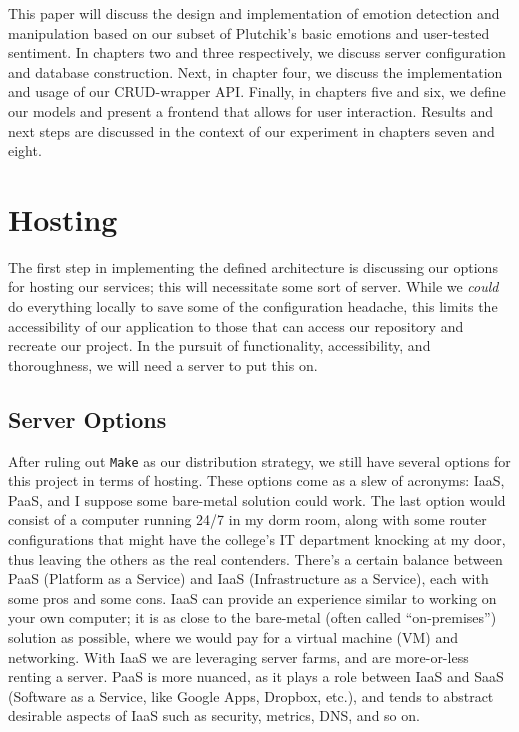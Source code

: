 \documentclass[11pt, twoside, reqno]{book}
\begin{document}
This paper will discuss the design and implementation of emotion detection and manipulation based on our subset of Plutchik's basic emotions and user-tested sentiment. In chapters two and three respectively, we discuss server configuration and database construction. Next, in chapter four, we discuss the implementation and usage of our CRUD-wrapper API. Finally, in chapters five and six, we define our models and present a frontend that allows for user interaction. Results and next steps are discussed in the context of our experiment in chapters seven and eight.

























\chapter{Hosting}

The first step in implementing the defined architecture is discussing our options for hosting our services; this will necessitate some sort of server. While we \textit{could} do everything locally to save some of the configuration headache, this limits the accessibility of our application to those that can access our repository and recreate our project. In the pursuit of functionality, accessibility, and thoroughness, we will need a server to put this on.

\section{Server Options}

After ruling out \texttt{Make} as our distribution strategy, we still have several options for this project in terms of hosting. These options come as a slew of acronyms: IaaS, PaaS, and I suppose some bare-metal solution could work. The last option would consist of a computer running 24/7 in my dorm room, along with some router configurations that might have the college's IT department knocking at my door, thus leaving the others as the real contenders. There's a certain balance between PaaS (Platform as a Service) and IaaS (Infrastructure as a Service), each with some pros and some cons. IaaS can provide an experience similar to working on your own computer; it is as close to the bare-metal (often called ``on-premises'') solution as possible, where we would pay for a virtual machine (VM) and networking. With IaaS we are leveraging server farms, and are more-or-less renting a server. PaaS is more nuanced, as it plays a role between IaaS and SaaS (Software as a Service, like Google Apps, Dropbox, etc.), and tends to abstract desirable aspects of IaaS such as security, metrics, DNS, and so on.
\end{document}
